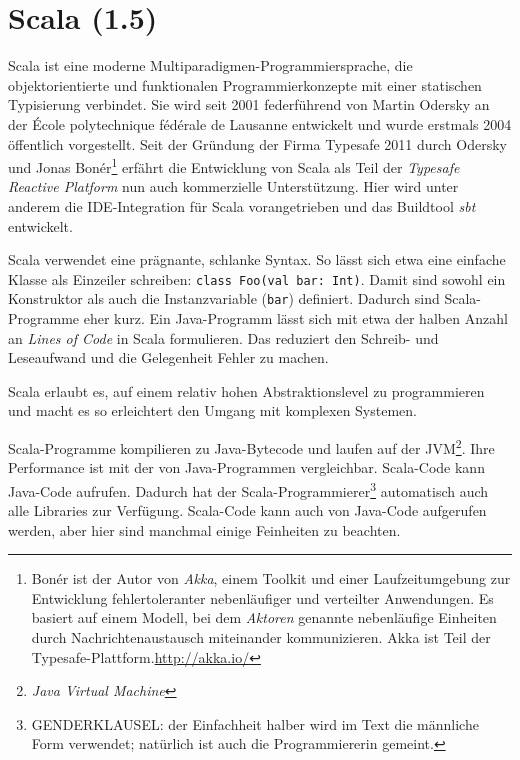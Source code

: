 \documentclass[a4paper, 12pt, listof=totoc, bibliography=totoc]{scrreprt}
\begin{document}
\section{Scala (1.5)}



Scala ist eine moderne Multiparadigmen-Programmiersprache, die objektorientierte und funktionalen Programmierkonzepte mit einer statischen Typisierung verbindet. Sie wird seit 2001 federführend von Martin Odersky an der École polytechnique fédérale de Lausanne entwickelt und wurde erstmals 2004 öffentlich vorgestellt.
Seit der Gründung der Firma Typesafe 2011 durch Odersky und Jonas Bonér\footnote{
	Bonér ist der Autor von \textit{Akka}, einem Toolkit und einer Laufzeitumgebung zur Entwicklung fehlertoleranter nebenläufiger und verteilter Anwendungen. Es basiert auf einem Modell, bei dem \textit{Aktoren} genannte nebenläufige Einheiten durch Nachrichtenaustausch miteinander kommunizieren. Akka ist Teil der Typesafe-Plattform.\url{http://akka.io/}}
erfährt die Entwicklung von Scala als Teil der \textit{Typesafe Reactive Platform} nun auch kommerzielle Unterstützung.
Hier wird unter anderem die IDE-Integration für Scala vorangetrieben und das Buildtool \textit{sbt} entwickelt.\cite{scala-lang2011.CSS} 

Scala verwendet eine prägnante, schlanke Syntax. So lässt sich etwa eine einfache Klasse als Einzeiler schreiben: \texttt{class Foo(val bar: Int)}. Damit sind sowohl ein Konstruktor als auch die Instanzvariable (\texttt{bar}) definiert. Dadurch sind Scala-Programme eher kurz. Ein Java-Programm lässt sich mit etwa der halben Anzahl an \textit{Lines of Code} in Scala formulieren. Das reduziert den Schreib- und Leseaufwand und die Gelegenheit Fehler zu machen.

Scala erlaubt es, auf einem relativ hohen Abstraktionslevel zu programmieren und macht es so erleichtert den Umgang mit komplexen Systemen.

Scala-Programme kompilieren zu Java-Bytecode und laufen auf der JVM\footnote{
	\textit{Java Virtual Machine}}. 
Ihre Performance ist mit der von Java-Programmen vergleichbar. Scala-Code kann Java-Code aufrufen. Dadurch hat der Scala-Programmierer\footnote{
	GENDERKLAUSEL: der Einfachheit halber wird im Text die männliche Form verwendet; natürlich ist auch die Programmiererin gemeint.} 
automatisch auch alle Libraries zur Verfügung. Scala-Code kann auch von Java-Code aufgerufen werden, aber hier sind manchmal einige Feinheiten zu beachten.\cite[S. 13 ff.]{odersky2008.PIS}
\end{document}
